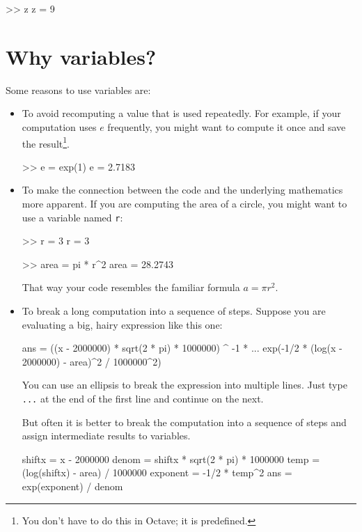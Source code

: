 \documentclass[main.tex]{subfiles}
\begin{document}
\begin{code}
>> z
z = 9
\end{code}


\section{Why variables?}

Some reasons to use variables are:


\begin{itemize}

\item To avoid recomputing a value that is used repeatedly.  For
example, if your computation uses $e$ frequently, you might
want to compute it once and save the result\footnote{You don't have to do this in Octave; it is predefined.}.

\begin{code}
>> e = exp(1)
e = 2.7183
\end{code}

\item To make the connection between the code and the underlying
mathematics more apparent.  If you are computing the area of a circle,
you might want to use a variable named {\tt r}:

\begin{code}
>> r = 3
r = 3

>> area = pi * r^2
area = 28.2743
\end{code}

That way your code resembles the familiar formula $a = \pi r^2$.

\item To break a long computation into a sequence of steps.
Suppose you are evaluating a big, hairy expression like this one:
\begin{code}
ans = ((x - 2000000) * sqrt(2 * pi) * 1000000) ^ -1 * ...
exp(-1/2 * (log(x - 2000000) - area)^2 / 1000000^2)
\end{code}

You can use an ellipsis to break the expression into multiple lines.
Just type {\tt ...} at the end of the first line and continue on the
next.


But often it is better to break the computation into a sequence of
steps and assign intermediate results to variables.

\begin{code}
shiftx = x - 2000000
denom = shiftx * sqrt(2 * pi) * 1000000
temp = (log(shiftx) - area) / 1000000
exponent = -1/2 * temp^2
ans = exp(exponent) / denom
\end{code}


\end{itemize}
\end{document}
